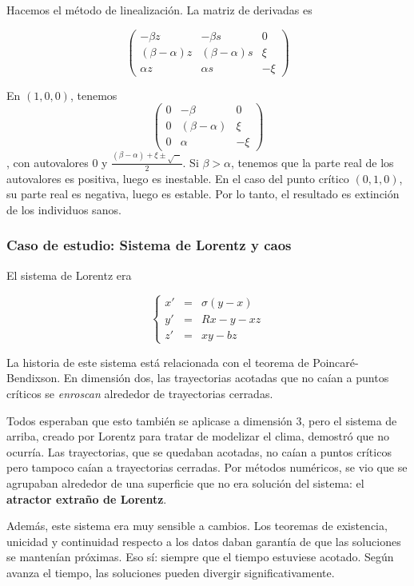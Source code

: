 Hacemos el método de linealización. La matriz de derivadas es

\[ \begin{pmatrix}
-βz & -βs & 0 \\
(β-α)z & (β-α)s & ξ \\
αz & αs & -ξ
\end{pmatrix} \]

En $(1,0,0)$, tenemos \[ \begin{pmatrix}
0 & -β & 0 \\
0 & (β-α) & ξ \\
0 & α & -ξ
\end{pmatrix} \], con autovalores $0$ y $\frac{(β-α) + ξ \pm \sqrt{\cdots}}{2}$. Si $β>α$, tenemos que la parte real de los autovalores es positiva, luego es inestable. En el caso del punto crítico $(0,1,0)$, su parte real es negativa, luego es estable. Por lo tanto, el resultado es extinción de los individuos sanos.

\subsubsection{Caso de estudio: Sistema de Lorentz y caos}

El sistema de Lorentz era

\[ \left\{\begin{array}{rcl}
x' &=& σ(y-x) \\ 
y' &=& Rx - y -xz \\
z' &=& xy -bz
 \end{array}\right. \]

La historia de este sistema está relacionada con el teorema de Poincaré-Bendixson. En dimensión dos, las trayectorias acotadas que no caían a puntos críticos se \textit{enroscan} alrededor de trayectorias cerradas.

Todos esperaban que esto también se aplicase a dimensión 3, pero el sistema de arriba, creado por Lorentz para tratar de modelizar el clima, demostró que no ocurría. Las trayectorias, que se quedaban acotadas, no caían a puntos críticos pero tampoco caían a trayectorias cerradas. Por métodos numéricos, se vio que se agrupaban alrededor de una superficie que no era solución del sistema: el \textbf{atractor extraño de Lorentz}.

Además, este sistema era muy sensible a cambios. Los teoremas de existencia, unicidad y continuidad respecto a los datos daban garantía de que las soluciones se mantenían próximas. Eso sí: siempre que el tiempo estuviese acotado. Según avanza el tiempo, las soluciones pueden divergir significativamente.
